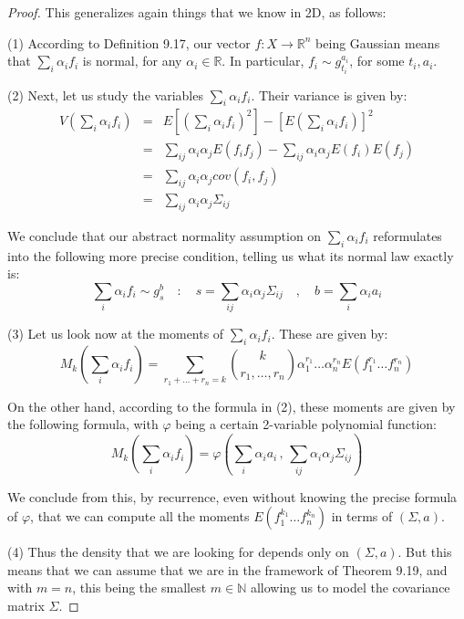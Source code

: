 \documentclass[12pt]{amsbook}
\begin{document}
\begin{proof}
This generalizes again things that we know in 2D, as follows:

\medskip

(1) According to Definition 9.17, our vector $f:X\to\mathbb R^n$ being Gaussian means that $\sum_i\alpha_if_i$ is normal, for any $\alpha_i\in\mathbb R$. In particular, $f_i\sim g_{t_i}^{a_i}$, for some $t_i,a_i$.

\medskip

(2) Next, let us study the variables $\sum_i\alpha_if_i$. Their variance is given by:
\begin{eqnarray*}
V\left(\sum_i\alpha_if_i\right)
&=&E\left[\left(\sum_i\alpha_if_i\right)^2\right]-\left[E\left(\sum_i\alpha_if_i\right)\right]^2\\
&=&\sum_{ij}\alpha_i\alpha_jE(f_if_j)-\sum_{ij}\alpha_i\alpha_jE(f_i)E(f_j)\\
&=&\sum_{ij}\alpha_i\alpha_jcov(f_i,f_j)\\
&=&\sum_{ij}\alpha_i\alpha_j\Sigma_{ij}
\end{eqnarray*}

We conclude that our abstract normality assumption on $\sum_i\alpha_if_i$ reformulates into the following more precise condition, telling us what its normal law exactly is:
$$\sum_i\alpha_if_i\sim g_s^b\quad:\quad s=\sum_{ij}\alpha_i\alpha_j\Sigma_{ij}\quad,\quad  b=\sum_i\alpha_ia_i$$

(3) Let us look now at the moments of $\sum_i\alpha_if_i$. These are given by:
$$M_k\left(\sum_i\alpha_if_i\right)=\sum_{r_1+\ldots+r_n=k}\binom{k}{r_1,\ldots,r_n}\alpha_1^{r_1}\ldots\alpha_n^{r_n}E(f_1^{r_1}\ldots f_n^{r_n})$$

On the other hand, according to the formula in (2), these moments are given by the following formula, with $\varphi$ being a certain 2-variable polynomial function:
$$M_k\left(\sum_i\alpha_if_i\right)=\varphi\left(\sum_i\alpha_ia_i\,,\,\sum_{ij}\alpha_i\alpha_j\Sigma_{ij}\right)$$

We conclude from this, by recurrence, even without knowing the precise formula of $\varphi$, that we can compute all the moments $E(f_1^{k_1}\ldots f_n^{k_n})$ in terms of $(\Sigma,a)$.

\medskip

(4) Thus the density that we are looking for depends only on $(\Sigma,a)$. But this means that we can assume that we are in the framework of Theorem 9.19, and with $m=n$, this being the smallest $m\in\mathbb N$ allowing us to model the covariance matrix $\Sigma$.


\end{proof}
\end{document}
